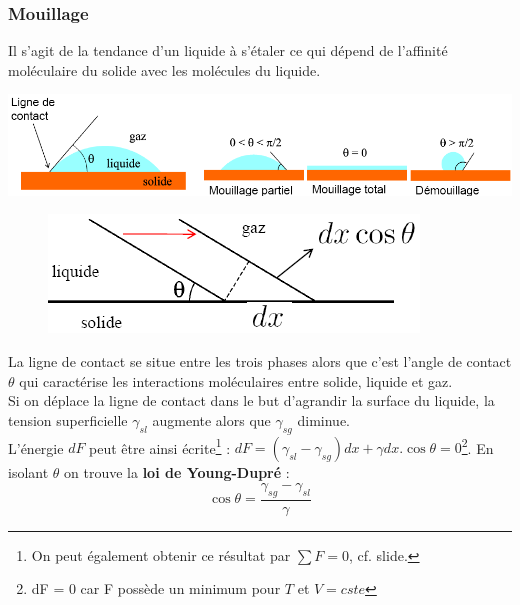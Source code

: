 \documentclass[british,french,11pt, a4paper, openany]{book}
\begin{document}
	\subsubsection{Mouillage}
	Il s'agit de la tendance d'un liquide à s'étaler ce qui dépend de l'affinité moléculaire du solide avec les molécules du liquide. 
	\begin{center}
		\includegraphics[scale=0.5]{cp/image14.png}
	\end{center}
	\begin{figure}
		\includegraphics[scale=0.4]{cp/image15.png}
	\end{figure}
	La ligne de contact se situe entre les trois phases alors que c'est l'angle de contact $\theta$ qui caractérise les interactions moléculaires entre solide, liquide et gaz.\\
	
	Si on déplace la ligne de contact dans le but d'agrandir la surface du liquide, la tension superficielle $\gamma_{sl}$ augmente alors que $\gamma_{sg}$ diminue.\\
	L'énergie $dF$ peut être ainsi écrite\footnote{On peut également obtenir ce résultat par $\sum F = 0$, cf. slide.} : $dF = (\gamma_{sl} - \gamma_{sg})dx + \gamma dx.\cos\theta = 0$\footnote{dF = 0 car F possède un minimum pour $T$ et $V = cste$}. En isolant $\theta$ on trouve la \textbf{loi de Young-Dupré} :
	\begin{equation}
	\cos\theta = \frac{\gamma_{sg} - \gamma_{sl}}{\gamma}
	\end{equation}
	
	\newpage
\end{document}
